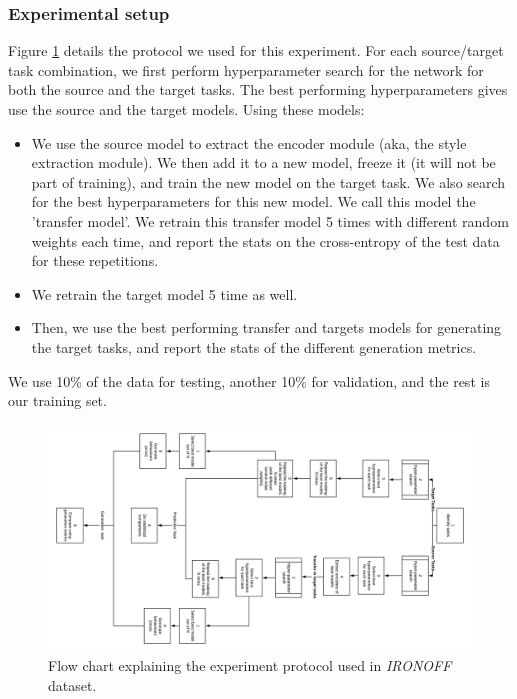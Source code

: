     \subsubsection{Experimental setup}
      \par Figure \ref{fig:ironoff_protocol} details the protocol we used for this experiment. For each source/target task combination, we first perform hyperparameter search for the network for both the source and the target tasks. The best performing hyperparameters gives use the source and the target models. Using these models:
      \begin{itemize}
        \item We use the source model to extract the encoder module (aka, the style extraction module). We then add it to a new model, freeze it (it will not be part of training), and train the new model on the target task. We also search for the best hyperparameters for this new model. We call this model the 'transfer model'. We retrain this transfer model 5 times with different random weights each time, and report the stats on the cross-entropy of the test data for these repetitions.
        \item We retrain the target model 5 time as well.
        \item Then, we use the best performing transfer and targets models for generating the target tasks, and report the stats of the different generation metrics.
      \end{itemize}
      \par We use 10\% of the data for testing, another 10\% for validation, and the rest is our training set.

    \begin{figure}
      \includegraphics[scale=0.3]{images/sota/ironoff_results/IRONOFF_transfer_learning_flow.png}
      \caption[\textit{IRONOFF} experimental protocol]{Flow chart explaining the experiment protocol used in \textit{IRONOFF} dataset.}
      \label{fig:ironoff_protocol}
    \end{figure}

